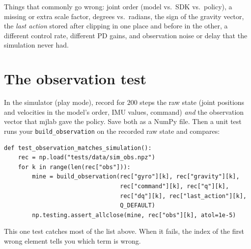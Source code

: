Things that commonly go wrong: joint order (model vs.\ SDK vs.\ policy), a missing or extra scale factor, degrees vs.\ radians, the sign of the gravity vector, the \emph{last action} stored after clipping in one place and before in the other, a different control rate, different PD gains, and observation noise or delay that the simulation never had.

\section*{The observation test}
In the simulator (play mode), record for $200$ steps the raw state (joint positions and velocities in the model's order, IMU values, command) \emph{and} the observation vector that mjlab gave the policy. Save both as a NumPy file. Then a unit test runs your \verb!build_observation! on the recorded raw state and compares:
\begin{verbatim}
def test_observation_matches_simulation():
    rec = np.load("tests/data/sim_obs.npz")
    for k in range(len(rec["obs"])):
        mine = build_observation(rec["gyro"][k], rec["gravity"][k],
                                 rec["command"][k], rec["q"][k],
                                 rec["dq"][k], rec["last_action"][k],
                                 Q_DEFAULT)
        np.testing.assert_allclose(mine, rec["obs"][k], atol=1e-5)
\end{verbatim}
This one test catches most of the list above. When it fails, the index of the first wrong element tells you which term is wrong.

